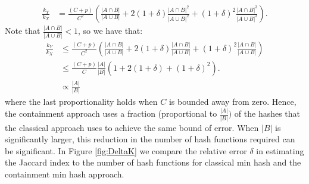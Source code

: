 \documentclass[11pt,reqno]{amsart}
\theoremstyle{remark}
\numberwithin{equation}{section}
\newcommand{\classicX}{X}
\newcommand{\containX}{Y}
\begin{document}
\begin{align}
\frac{ k_\containX}{k_\classicX}
&= \frac{(C+p)}{C^2}\left(\frac{|A\cap B|}{|A\cup B|}+2(1+\delta)\frac{|A\cap B|^2}{|A\cup B|^2}+(1+\delta)^2\frac{|A\cap B|^3}{|A\cup B|^3}\right). \label{eqn:KestOverJest}
\end{align}
Note that $\frac{|A\cap B|}{|A\cup B|} <1$, so we have that:
\begin{align}
\frac{ k_\containX}{k_\classicX} &\leq \frac{(C+p)}{C^2}\left(\frac{|A\cap B|}{|A\cup B|}+2(1+\delta)\frac{|A\cap B|}{|A\cup B|}+(1+\delta)^2\frac{|A\cap B|}{|A\cup B|}\right)\\
&\leq \frac{(C+p)}{C}\frac{|A|}{|B|}\left(1+2(1+\delta)+(1+\delta)^2\right).\\
&\propto \frac{|A|}{|B|} \label{kj/kest}
\end{align}
where the last proportionality holds when $C$ is bounded away from zero.
Hence, the containment approach uses a fraction (proportional to $\frac{|A|}{|B|})$ of the hashes that the classical approach uses to achieve the same bound of error. When $|B|$ is significantly larger, this reduction in the number of hash functions required can be significant. In Figure \ref{fig:DeltaK} we compare the relative error $\delta$ in estimating the Jaccard index to the number of hash functions for classical min hash and the containment min hash approach.
\end{document}

